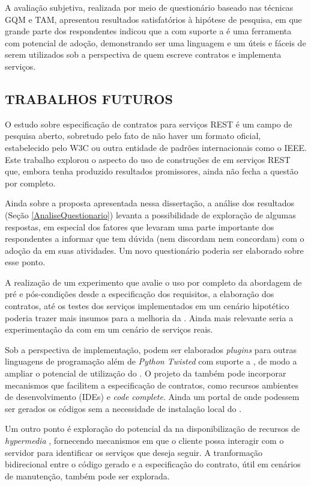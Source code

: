 A avaliação subjetiva, realizada por meio de questionário baseado nas técnicas GQM e TAM, apresentou
resultados satisfatórios à hipótese de pesquisa, em que grande parte dos respondentes indicou que a \neoidl{} com suporte
a \designbycontract{} é uma ferramenta com potencial de adoção, demonstrando ser uma linguagem e um 
\framework{} úteis e fáceis de serem utilizados sob a perspectiva de quem escreve contratos e implementa
serviços. 

\subsection{TRABALHOS FUTUROS}


O estudo sobre especificação de contratos para serviços REST é um campo de
pesquisa aberto, sobretudo pelo fato de não haver um formato oficial,
estabelecido pelo W3C ou outra entidade de padrões internacionais como o IEEE.
Este trabalho explorou o aspecto do uso de construções de \designbycontract{}
em serviços REST que, embora tenha produzido resultados promissores, ainda não
fecha a questão por completo.

Ainda sobre a proposta apresentada nessa dissertação, a análise dos resultados
(Seção \ref{AnaliseQuestionario}) levanta a possibilidade de exploração de
algumas respostas, em especial dos fatores que levaram uma parte importante dos
respondentes a informar que tem dúvida (nem discordam nem concordam) com o
adoção da \neoidl{} em suas atividades. Um novo questionário poderia ser
elaborado sobre esse ponto.

A realização de um experimento que avalie o uso por completo da abordagem de
pré e pós-condições desde a especificação dos requisitos, a elaboração dos
contratos, até os testes dos serviços implementados em um cenário hipotético
poderia trazer mais insumos para a melhoria da \neoidl{}. Ainda mais relevante
seria a experimentação da \neoidl{} com \designbycontract{} em um cenário de serviços reais.

Sob a perspectiva de implementação, podem ser elaborados \textit{plugins} para
outras linguagens de programação além de \textit{Python Twisted} com suporte a
\designbycontract{}, de modo a ampliar o potencial de utilização do
\framework{}. O projeto da \neoidl{} também pode incorporar mecanismos que
facilitem a especificação de contratos, como recursos ambientes
de desenvolvimento (IDEs) e \textit{code complete}. Ainda um portal de onde
podessem ser gerados os códigos sem a necessidade de instalação local do
\framework{}.

Um outro ponto é exploração do potencial da \neoidl{} na disponibilização de
recursos de \textit{hypermedia} \cite{webber2010rest}, fornecendo mecanismos
em que o cliente possa interagir com o servidor para identificar os serviços
que deseja seguir. A tranformação bidirecional entre o código gerado e a
especificação do contrato, útil em cenários de manutenção, também pode ser
explorada.